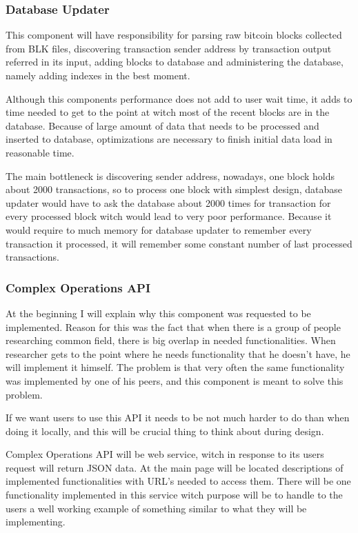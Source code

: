 \documentclass[12pt, en, eng]{mgr}
\begin{document}
\subsubsection{Database Updater}
This component will have responsibility for parsing raw bitcoin blocks collected from BLK files, discovering transaction sender address by transaction output referred in its input, adding blocks to database and administering the database, namely adding indexes in the best moment.

Although this components performance does not add to user wait time, it adds to time needed to get to the point at witch most of the recent blocks are in the database. Because of large amount of data that needs to be processed and inserted to database, optimizations are necessary to finish initial data load in reasonable time.

The main bottleneck is discovering sender address, nowadays, one block holds about 2000 transactions, so to process one block with simplest design, database updater would have to ask the database about 2000 times for transaction for every processed block witch would lead to very poor performance. Because it would require to much memory for database updater to remember every transaction it processed, it will remember some constant number of last processed transactions.

\subsubsection{Complex Operations API}
At the beginning I will explain why this component was requested to be implemented. Reason for this was the fact that when there is a group of people researching common field, there is big overlap in needed functionalities. When researcher gets to the point where he needs functionality that he doesn't have, he will implement it himself. The problem is that very often the same functionality was implemented by one of his peers, and this component is meant to solve this problem. 

If we want users to use this API it needs to be not much harder to do than when doing it locally, and this will be crucial thing to think about during design.

Complex Operations API will be web service, witch in response to its users request will return JSON data. At the main page will be located descriptions of implemented functionalities with URL's needed to access them. There will be one functionality implemented in this service witch purpose will be to handle to the users a well working example of something similar to what they will be implementing.   
\end{document}
